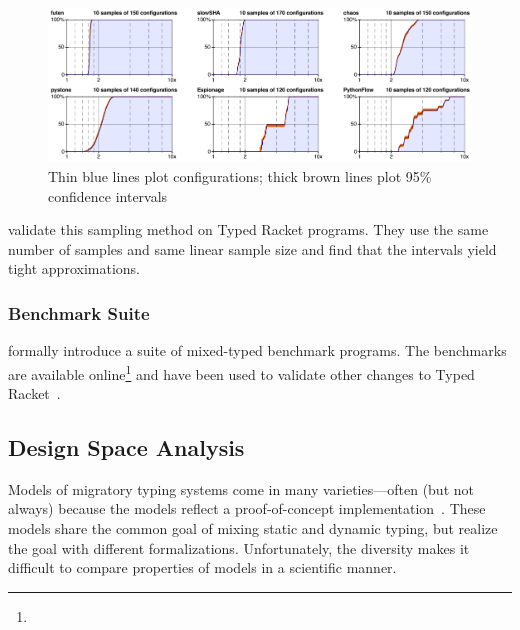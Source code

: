 \begin{figure}[t]
  \includegraphics[width=\columnwidth]{src/sampling.png}
  \caption{Thin blue lines plot  configurations; thick brown lines plot 95\% confidence intervals}
  \label{fig:sampling}
\end{figure}

\citet{gtnffvf-jfp-2019} validate this sampling method on Typed Racket
 programs.
They use the same number of samples and same linear sample size and find
 that the intervals yield tight approximations.



\subsubsection{Benchmark Suite}

\citet{gtnffvf-jfp-2019} formally introduce a suite of mixed-typed benchmark
 programs.
The benchmarks are available online\footnote{}
 and have been used to validate other changes to Typed Racket~\cite{gf-icfp-2018,bbst-oopsla-2017}.


\subsection{Design Space Analysis}

Models of migratory typing systems come in many varieties---often (but not always) because
 the models reflect a proof-of-concept implementation~\cite{bat-ecoop-2014,rtsf-sac-2013,rsfbv-popl-2015,acftd-scp-2013,cvgrl-oopsla-2017,mmi-dls-2015,bdt-esop-2016,wnlov-popl-2010,mt-oopsla-2017,vss-popl-2017,tf-popl-2008,clzv-ecoop-2018}.
These models share the common goal of mixing static and dynamic typing,
 but realize the goal with different formalizations.
Unfortunately, the diversity makes it difficult to compare properties of
 models in a scientific manner.

